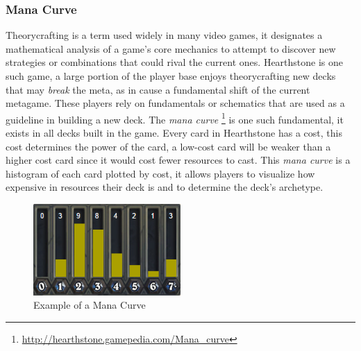\documentclass{report} %
\begin{document}
\subsubsection{Mana Curve}
	Theorycrafting is a term used widely in many video games, it designates a mathematical analysis of a game's core mechanics to attempt to discover new strategies or combinations that could rival the current ones. Hearthstone is one such game, a large portion of the player base enjoys theorycrafting new decks that may {\it{break}} the meta, as in cause a fundamental shift of the current metagame. These players rely on fundamentals or schematics that are used as a guideline in building a new deck. The {\it{mana curve}} \footnote{\url{http://hearthstone.gamepedia.com/Mana_curve}} is one such fundamental, it exists in all decks built in the game. Every card in Hearthstone has a cost, this cost determines the power of the card, a low-cost card will be weaker than a higher cost card since it would cost fewer resources to cast. This {\it{mana curve}} is a histogram of each card plotted by cost, it allows players to visualize how expensive in resources their deck is and to determine the deck's archetype. 
\begin{figure}[h]
\centering
\includegraphics[width=0.5\textwidth]{mana_curve}
\caption{Example of a Mana Curve\protect\footnotemark}
\label{board}
\end{figure}
\end{document}
